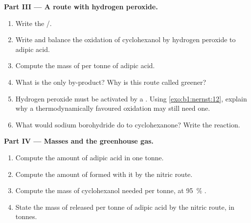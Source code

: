 \begin{problem}
\medskip
\noindent\textbf{Part III --- A route with hydrogen peroxide.}
\begin{enumerate}[resume]
  \item Write the  /.
  \item Write and balance the oxidation of cyclohexanol by hydrogen
        peroxide to adipic acid.
  \item Compute the mass of  per tonne of adipic acid.
  \item What is the only by-product? Why is this route called greener?
  \item Hydrogen peroxide must be activated by a . Using
        \cref{exo:b1:nernst:12}, explain why a thermodynamically favoured
        oxidation may still need one.
  \item What would sodium borohydride do to cyclohexanone? Write the
        reaction.
\end{enumerate}

\medskip
\noindent\textbf{Part IV --- Masses and the greenhouse gas.}
\begin{enumerate}[resume]
  \item Compute the amount of adipic acid in one tonne.
  \item Compute the amount of  formed with it by the nitric route.
  \item Compute the mass of cyclohexanol needed per tonne, at
        \qty{95}{\percent} .
  \item State the mass of  released per tonne of adipic acid by the
        nitric route, in tonnes.
\end{enumerate}
\end{problem}
